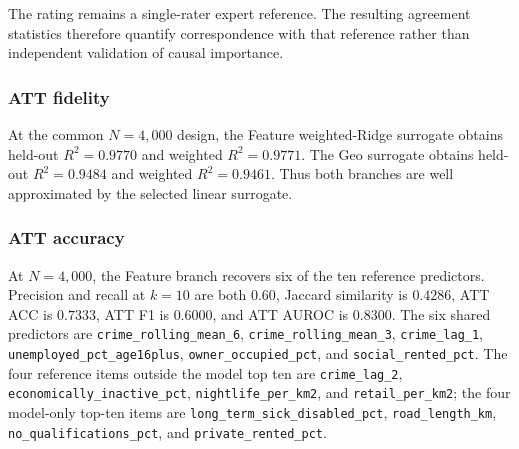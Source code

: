 The rating remains a single-rater expert reference. The resulting agreement statistics therefore quantify correspondence with that reference rather than independent validation of causal importance.


\subsubsection{ATT fidelity}
\label{sec:hull_att_fidelity}

At the common $N=4{,}000$ design, the Feature weighted-Ridge surrogate obtains held-out $R^2=0.9770$ and weighted $R^2=0.9771$. The Geo surrogate obtains held-out $R^2=0.9484$ and weighted $R^2=0.9461$. Thus both branches are well approximated by the selected linear surrogate.

\begin{table}[H]
\centering
\caption{ATT fidelity at the final $N=4{,}000$ design (seed 42).}
\label{tab:hull_fidelity_selected}
\small
{}
\end{table}


\subsubsection{ATT accuracy}
\label{sec:hull_att_accuracy}

At $N=4{,}000$, the Feature branch recovers six of the ten reference predictors. Precision and recall at $k=10$ are both $0.60$, Jaccard similarity is $0.4286$, ATT ACC is $0.7333$, ATT F1 is $0.6000$, and ATT AUROC is $0.8300$. The six shared predictors are \nolinkurl{crime_rolling_mean_6}, \nolinkurl{crime_rolling_mean_3}, \nolinkurl{crime_lag_1}, \nolinkurl{unemployed_pct_age16plus}, \nolinkurl{owner_occupied_pct}, and \nolinkurl{social_rented_pct}. The four reference items outside the model top ten are \nolinkurl{crime_lag_2}, \nolinkurl{economically_inactive_pct}, \nolinkurl{nightlife_per_km2}, and \nolinkurl{retail_per_km2}; the four model-only top-ten items are \nolinkurl{long_term_sick_disabled_pct}, \nolinkurl{road_length_km}, \nolinkurl{no_qualifications_pct}, and \nolinkurl{private_rented_pct}.


